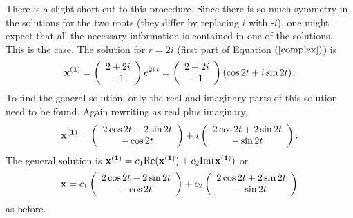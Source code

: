 \documentclass[leqno,DIV=calc,paper=a4,fontsize=11pt]{article}
\theoremstyle{definition}
\theoremstyle{plain}
\theoremstyle{remark}
\newcommand{\R}[1]{$(\ref{#1})$}
\begin{document}
\vspace{.2in}
There is a slight short-cut to this procedure. Since there is so much
symmetry in the solutions for the two roots (they differ by replacing
$i$ with -$i$), one might expect that all the necessary information is
contained in one of the solutions. This is the case. The solution for
$r=2i$ (first part of Equation \R{complex}) is
\[
{\bf x^{(1)}} =
\left(\begin{array}{c}2+2i\\-1\end{array}\right)e^{2i\,t}
=\left(\begin{array}{c}2+2i\\-1\end{array}\right)(\cos 2t+i\sin 2t).
\]
To find the general solution, only the real and imaginary parts of
this solution need to be found. Again rewriting as real plus
imaginary,
\[
{\bf x^{(1)}} =
\left(\begin{array}{c}
2\cos 2t-2\sin 2t\\
-\cos 2t\end{array}\right)+i
\left(\begin{array}{c}
2\cos 2t+2\sin 2t\\
-\sin 2t\end{array}\right).
\]
The general solution is ${\bf x^{(1)}}=c_1\mbox{Re}({\bf x^{(1)}})
+c_2\mbox{Im}({\bf x^{(1)}})$ or
\[
{\bf x} = c_1\left(\begin{array}{c}
2\cos 2t-2\sin 2t\\
-\cos 2t\end{array}\right)+
c_2\left(\begin{array}{c}
2\cos 2t+2\sin 2t\\
-\sin 2t\end{array}\right)
\]
as before.
\end{document}
